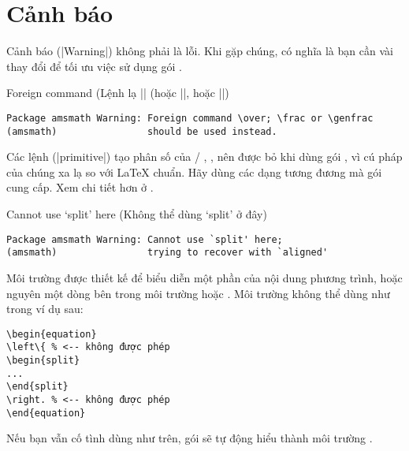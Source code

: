 \section{Cảnh báo}

Cảnh báo (|Warning|) không phải là lỗi.
Khi gặp chúng, có nghĩa là bạn cần vài thay đổi
để tối ưu việc sử dụng gói .

\begin{error}{Foreign command }
(Lệnh lạ |\over| (hoặc |\atop|, hoặc |\above|)
\errexa
\begin{verbatim}
Package amsmath Warning: Foreign command \over; \frac or \genfrac
(amsmath)                should be used instead.
\end{verbatim}
\errexpl
Các lệnh (|primitive|) tạo phân số của \tex/\mdash
{}, , \mdash nên được bỏ khi dùng gói ,
vì cú pháp của chúng xa lạ so với \LaTeX{} chuẩn. Hãy dùng các dạng
tương đương mà gói  cung cấp. Xem chi tiết hơn
ở .
\end{error}

\begin{error}{Cannot use `split' here}
(Không thể dùng `split' ở đây)
\errexa
\begin{verbatim}
Package amsmath Warning: Cannot use `split' here;
(amsmath)                trying to recover with `aligned'
\end{verbatim}
\errexpl
Môi trường  được thiết kế để biểu diễn một phần của
nội dung phương trình, hoặc nguyên một dòng bên trong môi trường
 hoặc . Môi trường  không thể dùng
như trong ví dụ sau:
\begin{verbatim}
\begin{equation}
\left\{ % <-- không được phép
\begin{split}
...
\end{split}
\right. % <-- không được phép
\end{equation}
\end{verbatim}
Nếu bạn vẫn cố tình dùng như trên, gói  sẽ tự động
hiểu thành môi trường .
\end{error}

